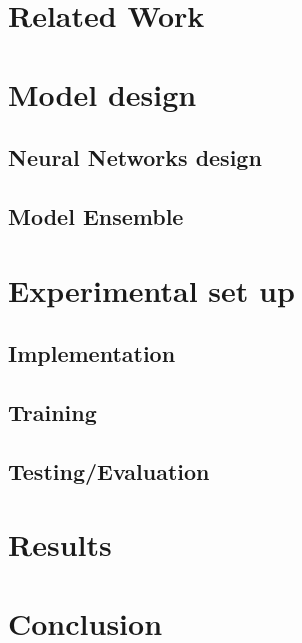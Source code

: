 \documentclass[conference]{IEEEtran}
\begin{document}
\section{Related Work}
\label{sec:related_work}


\section{Model design}
\label{sec:model_design}

\subsection{Neural Networks design}
\label{sec:NN_design}


\subsection{Model Ensemble}



\section{Experimental set up}
\label{sec:experiment}

\subsection{Implementation}
\label{sec:implementation}


\subsection{Training}


\subsection{Testing/Evaluation}



\section{Results}
\label{sec:experiments_performances}

\section{Conclusion}
\label{sec:conclusion}

\newpage
\end{document}

